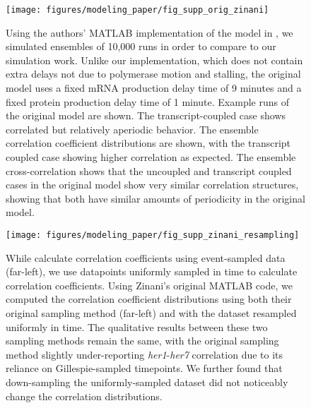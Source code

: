 \documentclass[11pt]{article}
\begin{document}
\begin{figure}[hbtp]
    \centering
    {\texttt{[image: figures/modeling\_paper/fig\_supp\_orig\_zinani]}
    \label{fig:supp:zinani_matlab_mRNA}
    \label{fig:supp:zinani_matlab_correlation}
    \label{fig:supp:zinani_matlab_cross_correlation}
    }
    \caption{Using the authors' MATLAB implementation of the model in \textcite{zinaniPairingSegmentationClock2021}, we simulated ensembles of 10,000 runs in order to compare to our simulation work. Unlike our implementation, which does not contain extra delays not due to polymerase motion and stalling, the original model uses a fixed mRNA production delay time of 9 minutes and a fixed protein production delay time of 1 minute.
         Example runs of the original model are shown. The transcript-coupled case shows correlated but relatively aperiodic behavior.
         The ensemble correlation coefficient distributions are shown, with the transcript coupled case showing higher correlation as expected.
         The ensemble cross-correlation shows that the uncoupled and transcript coupled cases in the original model show very similar correlation structures, showing that both have similar amounts of periodicity in the original model.
    }
    \label{fig:top:zinani_matlab}
\end{figure}

\begin{figure}[hbtp]
    \centering
    {\texttt{[image: figures/modeling\_paper/fig\_supp\_zinani\_resampling]}
    }
    \caption{While \textcite{zinaniPairingSegmentationClock2021} calculate correlation coefficients using event-sampled data (far-left), we use datapoints uniformly sampled in time to calculate correlation coefficients. Using Zinani's original MATLAB code, we computed the correlation coefficient distributions using both their original sampling method (far-left) and with the dataset resampled uniformly in time. The qualitative results between these two sampling methods remain the same, with the original sampling method slightly under-reporting \textit{her1}-\textit{her7} correlation due to its reliance on Gillespie-sampled timepoints. We further found that down-sampling the uniformly-sampled dataset did not noticeably change the correlation distributions.
    }
    \label{fig:top:supp_zinani_sampling}
\end{figure}
\end{document}
